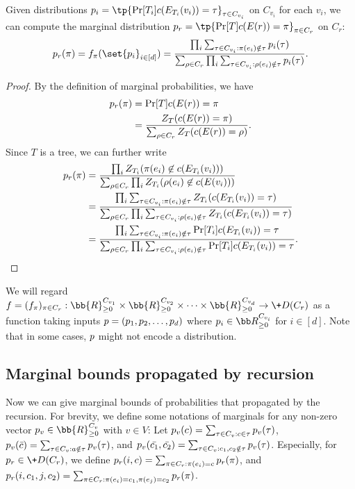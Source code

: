 \begin{lemma}\label{lem:tree-recursion}
    Given distributions $\*{p}_i=\tp{\Pr[T_i]{c(E_{T_i}(v_i))=\tau}}_{\tau\in C_{v_i}}$ on $C_{v_i}$ for each $v_i$, we can compute the marginal distribution $\*{p}_r=\tp{\Pr[T]{c(E(r))=\pi}}_{\pi \in C_r}$ on $C_r$:
\begin{align*}
    \*p_r(\pi)=f_\pi(\set{\*{p}_i}_{i\in [d]})=\frac{\prod_i \sum_{\tau
    \in C_{v_i}: \pi(e_i)\notin \tau} \*p_{i}(\tau)}{\sum_{\rho \in C_r} \prod_i \sum_{\tau
    \in C_{v_i}: \rho(e_i)\notin \tau} \*p_{i}(\tau)}.
\end{align*}
\end{lemma}
\begin{proof}
    By the definition of marginal probabilities, we have
\begin{align*}
    \*p_r(\pi)&=\Pr[T]{c(E(r))=\pi}\\
    &=\frac{Z_T(c(E(r))=\pi)}{\sum_{\rho \in C_r} Z_T(c(E(r))=\rho)}.
\end{align*}
Since $T$ is a tree, we can further write 
\begin{align*}
    \*p_r(\pi)&=\frac{\prod_i Z_{T_i}(\pi(e_i)\not\in c(E_{T_i}(v_i)))}{\sum_{\rho \in C_r} \prod_i Z_{T_i}(\rho(e_i)\not\in c(E(v_i)))}\\
    &=\frac{\prod_i \sum_{\tau
    \in C_{v_i} : \pi(e_i)\notin \tau} Z_{T_i}(c(E_{T_i}(v_i))=\tau)}{\sum_{\rho \in C_r} \prod_i \sum_{\tau
    \in C_{v_i}: \rho(e_i)\notin \tau} Z_{T_i}(c(E_{T_i}(v_i))=\tau)}\\
    &=\frac{\prod_i \sum_{\tau
    \in C_{v_i}: \pi(e_i)\notin \tau} \Pr[T_i]{c(E_{T_i}(v_i))=\tau}}{\sum_{\rho \in C_r} \prod_i \sum_{\tau
    \in C_{v_i}: \rho(e_i)\notin \tau} \Pr[T_i]{c(E_{T_i}(v_i))=\tau}}.
\end{align*}
\end{proof}
We will regard $f=(f_\pi)_{\pi \in C_r}: \bb{R}_{\geq 0}^{C_{v_1}}\times \bb{R}_{\geq 0}^{C_{v_2}}\times \cdots \times \bb{R}_{\geq 0}^{C_{v_d}} \rightarrow \+D(C_{r})$ as a function taking inputs $\*p = (\*p_1, \*p_2, \dots, \*p_d)$ where $\*p_i\in \bb R_{\ge 0}^{C_{v_i}}$ for $i\in [d]$. Note that in some cases, $\*p$ might not encode a distribution.

\subsection{Marginal bounds propagated by recursion}\label{sec:marginal_bounds_on_trees}
Now we can give marginal bounds of probabilities that propagated by the recursion. For brevity, we define some notations of marginals for any non-zero vector $\*p_v\in \bb{R}_{\geq 0}^{C_v}$ with $v\in V$: Let $\*p_v(c)=\sum_{\tau \in C_v:c \in \tau} \*p_v(\tau)$, $\*p_v(\bar{c})=\sum_{\tau \in C_v:a \notin \tau} \*p_v(\tau)$, and $\*p_v(\bar{c_1},\bar{c_2})=\sum_{\tau \in C_v:c_1,c_2 \notin \tau} \*p_v(\tau)$.
Especially, for $\*p_r \in \+D(C_r)$, we define $\*p_r(i,c)=\sum_{\pi \in C_r: \pi(e_i)=c} \*p_r(\pi)$, and $\*p_r(i,c_1,j,c_2)=\sum_{\pi \in C_r: \pi(e_i)=c_1, \pi(e_j)=c_2} \*p_r(\pi)$.

